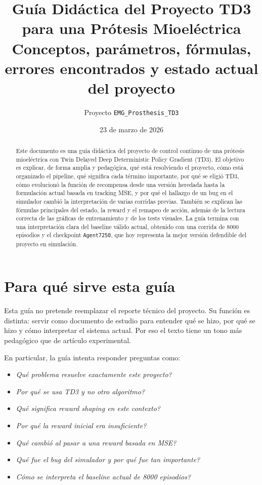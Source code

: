 \documentclass[11pt,a4paper]{article}
\title{\textbf{Gu\'ia Did\'actica del Proyecto TD3 para una Pr\'otesis Mioel\'ectrica}\\
\large Conceptos, par\'ametros, f\'ormulas, errores encontrados y estado actual del proyecto}
\author{Proyecto \texttt{EMG\_Prosthesis\_TD3}}
\date{23 de marzo de 2026}
\begin{document}
\maketitle

\begin{abstract}
Este documento es una gu\'ia did\'actica del proyecto de control continuo de una pr\'otesis mioel\'ectrica con Twin Delayed Deep Deterministic Policy Gradient (TD3). El objetivo es explicar, de forma amplia y pedag\'ogica, qu\'e est\'a resolviendo el proyecto, c\'omo est\'a organizado el pipeline, qu\'e significa cada t\'ermino importante, por qu\'e se eligi\'o TD3, c\'omo evolucion\'o la funci\'on de recompensa desde una versi\'on heredada hasta la formulaci\'on actual basada en tracking MSE, y por qu\'e el hallazgo de un bug en el simulador cambi\'o la interpretaci\'on de varias corridas previas. Tambi\'en se explican las f\'ormulas principales del estado, la reward y el remapeo de acci\'on, adem\'as de la lectura correcta de las gr\'aficas de entrenamiento y de los tests visuales. La gu\'ia termina con una interpretaci\'on clara del baseline v\'alido actual, obtenido con una corrida de 8000 episodios y el checkpoint \texttt{Agent7250}, que hoy representa la mejor versi\'on defendible del proyecto en simulaci\'on.
\end{abstract}

\tableofcontents
\newpage

\section{Para qu\'e sirve esta gu\'ia}

Esta gu\'ia no pretende reemplazar el reporte t\'ecnico del proyecto. Su funci\'on es distinta: servir como documento de estudio para entender qu\'e se hizo, por qu\'e se hizo y c\'omo interpretar el sistema actual. Por eso el texto tiene un tono m\'as pedag\'ogico que de art\'iculo experimental.

En particular, la gu\'ia intenta responder preguntas como:
\begin{itemize}[leftmargin=1.2cm]
    \item \emph{Qu\'e problema resuelve exactamente este proyecto?}
    \item \emph{Por qu\'e se usa TD3 y no otro algoritmo?}
    \item \emph{Qu\'e significa reward shaping en este contexto?}
    \item \emph{Por qu\'e la reward inicial era insuficiente?}
    \item \emph{Qu\'e cambi\'o al pasar a una reward basada en MSE?}
    \item \emph{Qu\'e fue el bug del simulador y por qu\'e fue tan importante?}
    \item \emph{C\'omo se interpreta el baseline actual de 8000 episodios?}
\end{itemize}
\end{document}

